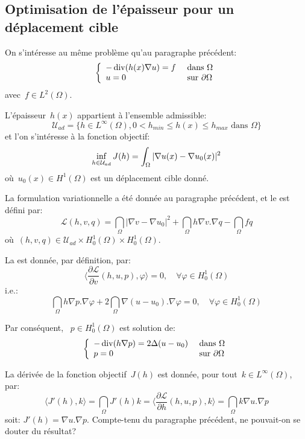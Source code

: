 \medskip
\subsection{Optimisation de l'épaisseur pour un déplacement cible}

On s'intéresse au même problème qu'au paragraphe précédent:
\[\left\{\begin{array}{ll} -\operatorname{div} (h(x)\nabla u)=f &\text{ dans }\Omega\\ u=0 &\text{ sur }\partial\Omega \end{array} \right. \]
avec~$f\in L^2(\Omega)$.

L'épaisseur~$h(x)$ appartient à l'ensemble admissible:
\[ \mathcal{U}_{ad} = \{ h\in L^\infty(\Omega), 0< h_{min}\le h(x)\le h_{max} \text{ dans }\Omega \} \]
et l'on s'intéresse à la fonction objectif:
\[\colorblue \inf_{h\in\mathcal{U}_{ad}} J(h) = \dint_\Omega |\nabla u(x)-\nabla u_0(x)|^2 \]
où~$u_0(x)\in H^1(\Omega)$ est un déplacement cible donné.

\medskip
La formulation variationnelle a été donnée au paragraphe précédent, et le  est défini par:
\[ \mathcal{L}(h,v,q) = \dint_\Omega |\nabla v-\nabla u_0|^2 + \dint_\Omega h\nabla v.\nabla q - \dint_\Omega fq \]
où~$(h,v,q)\in \mathcal{U}_{ad}\times H^1_0(\Omega)\times H^1_0(\Omega)$.

\medskip
La  est donnée, par définition, par: 
\[ \langle \dfrac{\partial \mathcal{L}}{\partial v}(h,u,p),\varphi\rangle=0, \quad \forall\varphi\in H^1_0(\Omega) \]
i.e.:
\[ \dint_\Omega h\nabla p.\nabla\varphi + 2 \dint_\Omega \nabla(u-u_0).\nabla\varphi =0, \quad \forall\varphi\in H^1_0(\Omega) \]

Par conséquent, ~$p\in H^1_0(\Omega)$ est solution de:
\[\left\{\begin{array}{ll}
-\operatorname{div}(h\nabla p) = 2\Delta(u-u_0) &\text{ dans }\Omega\\
p=0 &\text{ sur }\partial\Omega
\end{array}\right.\]

\medskip
La dérivée de la fonction objectif~$J(h)$ est donnée, pour tout~$k\in L^\infty(\Omega)$, par:
\[ \langle J'(h),k\rangle = \dint_\Omega J'(h)k = \langle\dfrac{\partial\mathcal{L}}{\partial h}(h,u,p),k\rangle =\dint_\Omega k\nabla u.\nabla p \]
soit: $J'(h)=\nabla u.\nabla p$. Compte-tenu du paragraphe précédent, ne pouvait-on se douter du résultat?

\medskip
